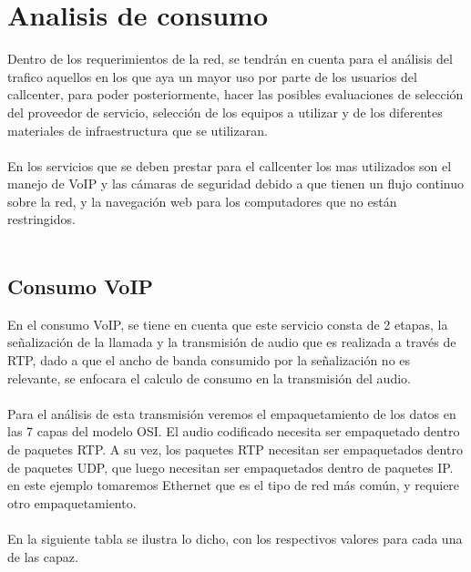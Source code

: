 \documentclass[12pt]{article}
\begin{document}
\pagebreak
\section{\textbf{Analisis de consumo}}
Dentro de los requerimientos de la red, se tendrán en cuenta para el análisis del trafico aquellos en los que aya un mayor uso por parte de los usuarios del callcenter, para poder posteriormente, hacer las posibles evaluaciones de selección del proveedor de servicio, selección de los equipos a utilizar y de los diferentes materiales de infraestructura que se utilizaran.\\\\
En los servicios que se deben prestar para el callcenter los mas utilizados son el manejo de VoIP y las cámaras de seguridad debido a que tienen un flujo continuo sobre la red, y la navegación web para los computadores que no están restringidos.\\\\

\subsection{\textbf{Consumo VoIP}}
En el consumo VoIP, se tiene en cuenta que este servicio consta de 2 etapas, la señalización de la llamada y la transmisión de audio que es realizada a través de RTP, dado a que el ancho de banda consumido por la señalización no es relevante, se enfocara el calculo de consumo en la transmisión del audio.\\\\
Para el análisis de esta transmisión veremos el empaquetamiento de los datos en las 7 capas del modelo OSI. El audio codificado necesita ser empaquetado dentro de paquetes RTP. A su vez, los paquetes RTP necesitan ser empaquetados dentro de paquetes UDP, que luego necesitan ser empaquetados dentro de paquetes IP. en este ejemplo tomaremos Ethernet que es el tipo de red más común, y requiere otro empaquetamiento.\\\\
En la siguiente tabla se ilustra lo dicho, con los respectivos valores para cada una de las capaz.\\\\
\end{document}
